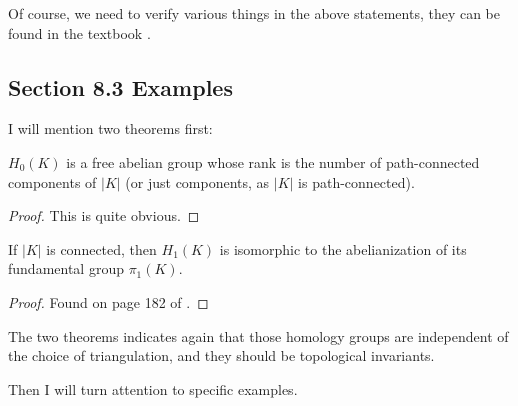 Of course, we need to verify various things in the above statements,
they can be found in the textbook \cite{book}.

\subsection{Section 8.3 Examples}
\label{sec:Section 8.3 Examples}

I will mention two theorems first:

\begin{thm}
    $H_0(K)$ is a free abelian group whose rank is the number of
    path-connected components of $|K|$ (or just components, as $|K|$
    is path-connected).
\end{thm}
\begin{proof}
    This is quite obvious.
\end{proof}

\begin{thm}
    If $|K|$ is connected, then $H_1(K)$ is isomorphic to the
    abelianization of its fundamental group $\pi_1(K)$.
\end{thm}
\begin{proof}
    Found on page 182 of \cite{book}.
\end{proof}

The two theorems indicates again that those homology groups are
independent of the choice of triangulation, and they should be
topological invariants. 

Then I will turn attention to specific examples.

